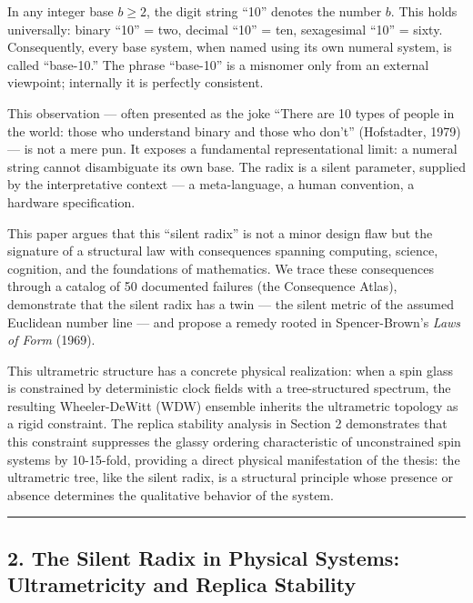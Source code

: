 \documentclass[
]{article}
\begin{document}
In any integer base \(b \geq 2\), the digit string ``10'' denotes the
number \(b\). This holds universally: binary ``10'' = two, decimal
``10'' = ten, sexagesimal ``10'' = sixty. Consequently, every base
system, when named using its own numeral system, is called ``base-10.''
The phrase ``base-10'' is a misnomer only from an external viewpoint;
internally it is perfectly consistent.

This observation --- often presented as the joke ``There are 10 types of
people in the world: those who understand binary and those who don't''
(Hofstadter, 1979) --- is not a mere pun. It exposes a fundamental
representational limit: a numeral string cannot disambiguate its own
base. The radix is a silent parameter, supplied by the interpretative
context --- a meta-language, a human convention, a hardware
specification.

This paper argues that this ``silent radix'' is not a minor design flaw
but the signature of a structural law with consequences spanning
computing, science, cognition, and the foundations of mathematics. We
trace these consequences through a catalog of 50 documented failures
(the Consequence Atlas), demonstrate that the silent radix has a twin
--- the silent metric of the assumed Euclidean number line --- and
propose a remedy rooted in Spencer-Brown's \emph{Laws of Form} (1969).

This ultrametric structure has a concrete physical realization: when a
spin glass is constrained by deterministic clock fields with a
tree-structured spectrum, the resulting Wheeler-DeWitt (WDW) ensemble
inherits the ultrametric topology as a rigid constraint. The replica
stability analysis in Section 2 demonstrates that this constraint
suppresses the glassy ordering characteristic of unconstrained spin
systems by 10-15-fold, providing a direct physical manifestation of the
thesis: the ultrametric tree, like the silent radix, is a structural
principle whose presence or absence determines the qualitative behavior
of the system.

\begin{center}\rule{0.5\linewidth}{0.5pt}\end{center}

\subsection{2. The Silent Radix in Physical Systems: Ultrametricity and
Replica
Stability}\label{the-silent-radix-in-physical-systems-ultrametricity-and-replica-stability}
\end{document}
